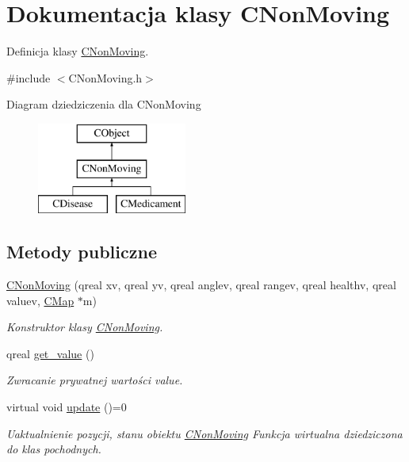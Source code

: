 \hypertarget{class_c_non_moving}{}\section{Dokumentacja klasy C\+Non\+Moving}
\label{class_c_non_moving}


Definicja klasy \mbox{\hyperlink{class_c_non_moving}{C\+Non\+Moving}}.  




{\ttfamily \#include $<$C\+Non\+Moving.\+h$>$}

Diagram dziedziczenia dla C\+Non\+Moving\begin{figure}[H]
\begin{center}
\leavevmode
\includegraphics[height=3.000000cm]{class_c_non_moving}
\end{center}
\end{figure}
\subsection*{Metody publiczne}
\begin{DoxyCompactItemize}
\item 
\mbox{\hyperlink{class_c_non_moving_a4f1dd301f116c087e277f431480bd088}{C\+Non\+Moving}} (qreal xv, qreal yv, qreal anglev, qreal rangev, qreal healthv, qreal valuev, \mbox{\hyperlink{class_c_map}{C\+Map}} $\ast$m)
\begin{DoxyCompactList}\small\item\em Konstruktor klasy \mbox{\hyperlink{class_c_non_moving}{C\+Non\+Moving}}. \end{DoxyCompactList}\item 
qreal \mbox{\hyperlink{class_c_non_moving_aef911361972d6ace43afb87426ab8f2e}{get\+\_\+value}} ()
\begin{DoxyCompactList}\small\item\em Zwracanie prywatnej wartości value. \end{DoxyCompactList}\item 
virtual void \mbox{\hyperlink{class_c_non_moving_ad17a839c59eb2639623e863a3d6c8740}{update}} ()=0
\begin{DoxyCompactList}\small\item\em Uaktualnienie pozycji, stanu obiektu \mbox{\hyperlink{class_c_non_moving}{C\+Non\+Moving}} Funkcja wirtualna dziedziczona do klas pochodnych. \end{DoxyCompactList}\end{DoxyCompactItemize}
